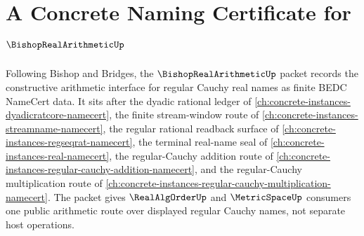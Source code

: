 \chapter{A Concrete Naming Certificate for $\BishopRealArithmeticUp$}
\label{ch:concrete-instances-bishop-real-arithmetic-namecert}

Following Bishop and Bridges, the $\BishopRealArithmeticUp$ packet records the constructive arithmetic interface for regular Cauchy real names as finite BEDC NameCert data. It sits after the dyadic rational ledger of \autoref{ch:concrete-instances-dyadicratcore-namecert}, the finite stream-window route of \autoref{ch:concrete-instances-streamname-namecert}, the regular rational readback surface of \autoref{ch:concrete-instances-regseqrat-namecert}, the terminal real-name seal of \autoref{ch:concrete-instances-real-namecert}, the regular-Cauchy addition route of \autoref{ch:concrete-instances-regular-cauchy-addition-namecert}, and the regular-Cauchy multiplication route of \autoref{ch:concrete-instances-regular-cauchy-multiplication-namecert}. The packet gives $\RealAlgOrderUp$ and $\MetricSpaceUp$ consumers one public arithmetic route over displayed regular Cauchy names, not separate host operations.


